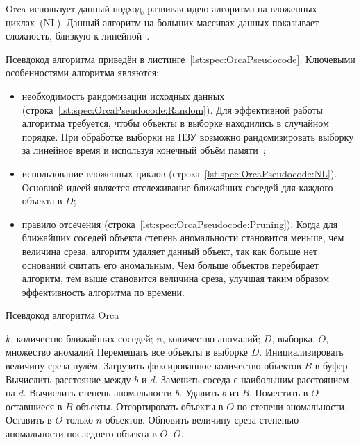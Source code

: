 Orca использует данный подход, развивая идею алгоритма на вложенных циклах~(NL). Данный алгоритм на больших массивах данных показывает сложность, близкую к линейной~\cite{BaySchwabacherOrca}.

Псевдокод алгоритма приведён в листинге~\ref{lst:spec:OrcaPseudocode}.
Ключевыми особенностями алгоритма являются:
\begin{itemize}
	\item необходимость рандомизации исходных данных (строка~\ref{lst:spec:OrcaPseudocode:Random}). Для эффективной работы алгоритма требуется, чтобы объекты в выборке находились в случайном порядке. При обработке выборки на ПЗУ возможно рандомизировать выборку за линейное время и используя конечный объём памяти~\cite{BaySchwabacherOrca};
	\item использование вложенных циклов (строка~\ref{lst:spec:OrcaPseudocode:NL}). Основной идеей является отслеживание ближайших соседей для каждого объекта в $D$;
	\item правило отсечения (строка~\ref{lst:spec:OrcaPseudocode:Pruning}). Когда для ближайших соседей объекта степень аномальности становится меньше, чем величина среза, алгоритм удаляет данный объект, так как больше нет оснований считать его аномальным. Чем больше объектов перебирает алгоритм, тем выше становится величина среза, улучшая таким образом эффективность алгоритма по времени.
\end{itemize}

\begin{algorithm}[h]
\caption{Псевдокод алгоритма Orca}
\label{lst:spec:OrcaPseudocode}
\begin{algorithmic}[1]
\REQUIRE $k$, количество ближайших соседей; $n$, количество аномалий; $D$, выборка.
\ENSURE $O$, множество аномалий
\STATE Перемешать все объекты в выборке $D$. \label{lst:spec:OrcaPseudocode:Random}
\STATE Инициализировать величину среза нулём.
	\STATE Загрузить фиксированное количество объектов $B$ в буфер.
	 \label{lst:spec:OrcaPseudocode:NL}
			\STATE Вычислить расстояние между $b$ и $d$.
				\STATE Заменить соседа с наибольшим расстоянием на $d$.
				\STATE Вычислить степень аномальности $b$.
				 \label{lst:spec:OrcaPseudocode:Pruning}
					\STATE Удалить $b$ из $B$.
				\ENDIF
			\ENDIF
		\ENDFOR
	\ENDFOR
	\STATE Поместить в $O$ оставшиеся в $B$ объекты.
	\STATE Отсортировать объекты в $O$ по степени аномальности.
	\STATE Оставить в $O$ только $n$ объектов.
	\STATE Обновить величину среза степенью аномальности последнего объекта в $O$.
\ENDWHILE
\RETURN $O$.
\end{algorithmic}
\end{algorithm}

